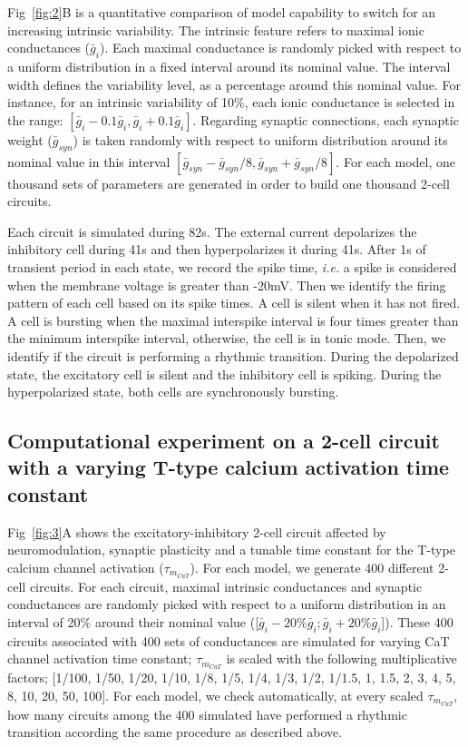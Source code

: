 Fig~\ref{fig:2}B is a quantitative comparison of model capability to switch for an increasing intrinsic variability. The intrinsic feature refers to maximal ionic conductances ($\bar{g}_i$). Each maximal conductance is randomly picked with respect to a uniform distribution in a fixed interval around its nominal value. The interval width defines the variability level, as a percentage around this nominal value. For instance, for an intrinsic variability of 10$\%$, each ionic conductance is selected in the range: $[\bar{g}_i-0.1\bar{g}_i,  \bar{g}_i+0.1\bar{g}_i]$. Regarding synaptic connections, each synaptic weight ($\bar{g}_{syn}$) is taken randomly with respect to uniform distribution around its nominal value in this interval $[\bar{g}_{syn}- \bar{g}_{syn}/8,  \bar{g}_{syn}+ \bar{g}_{syn}/8]$. For each model, one thousand sets of parameters are generated in order to build one thousand 2-cell circuits. 

Each circuit is simulated during 82s. The external current depolarizes the inhibitory cell during 41s and then hyperpolarizes it during 41s. After 1s of transient period in each state, we record the spike time, \textit{i.e.} a spike is considered when the membrane voltage is greater than -20mV. Then we identify the firing pattern of each cell based on its spike times. A cell is silent when it has not fired. A cell is bursting when the maximal interspike interval is four times greater than the minimum interspike interval, otherwise, the cell is in tonic mode. Then, we identify if the circuit is performing a rhythmic transition. During the depolarized state, the excitatory cell is silent and the inhibitory cell is spiking. During the hyperpolarized state, both cells are synchronously bursting.

\subsection{Computational experiment on a 2-cell circuit with a varying T-type calcium activation time constant }
Fig~\ref{fig:3}A shows the excitatory-inhibitory 2-cell circuit affected by neuromodulation, synaptic plasticity and a tunable  time constant for the T-type calcium channel activation ($\tau_{m_{CaT}}$). For each model, we generate 400 different 2-cell circuits. For each circuit, maximal intrinsic conductances and synaptic conductances are randomly picked with respect to a uniform distribution in an interval of 20$\%$ around their nominal value ([$\bar{g}_i -20\%\bar{g}_i; \bar{g}_i + 20\% \bar{g}_i$]). These 400 circuits associated with 400 sets of conductances are simulated for varying  CaT channel activation time constant; $\tau_{m_{CaT}}$ is scaled with the following multiplicative factors; [1/100, 1/50, 1/20, 1/10, 1/8, 1/5, 1/4, 1/3, 1/2, 1/1.5, 1, 1.5, 2, 3, 4, 5, 8, 10, 20, 50, 100]. For each model, we check automatically, at every scaled $\tau_{m_{CaT}}$,  how many circuits among the 400 simulated have performed a rhythmic transition  according the same procedure as described above.  

